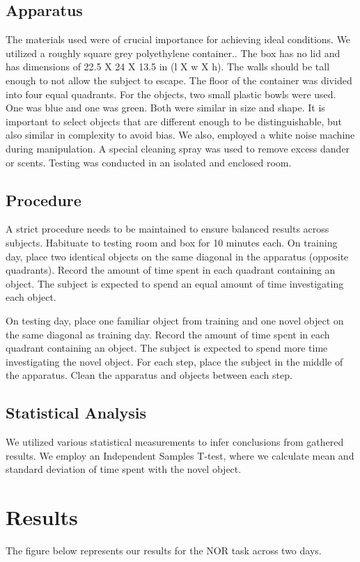\documentclass[a4paper, 12pt]{article}
\begin{document}
\subsection{Apparatus}
The materials used were of crucial importance for achieving ideal conditions. We utilized a roughly square grey polyethylene container.. The box has no lid and has dimensions of 22.5 X 24 X 13.5 in (l X w X h). The walls should be tall enough to not allow the subject to escape. The floor of the container was divided into four equal quadrants. For the objects, two small plastic bowls were used. One was blue and one was green. Both were similar in size and shape. It is important to select objects that are different enough to be distinguishable, but also similar in complexity to avoid bias. We also, employed a white noise machine during manipulation. A special cleaning spray was used to remove excess dander or scents. Testing was conducted in an isolated and enclosed room.

\subsection{Procedure}
A strict procedure needs to be  maintained to ensure balanced results across subjects. Habituate to testing room and box for 10 minutes each. On training day, place two identical objects on the same diagonal in the apparatus (opposite quadrants). Record the amount of time spent in each quadrant containing an object. The subject is expected to spend an equal amount of time investigating each object.

On testing day, place one familiar object from training and one novel object on the same diagonal as training day. Record the amount of time spent in each quadrant containing an object. The subject is expected to spend more time investigating the novel object.
For each step, place the subject in the middle of the apparatus. Clean the apparatus and objects between each step.

\subsection{Statistical Analysis}
We utilized various statistical measurements to infer conclusions from gathered results. We employ an Independent Samples T-test, where we calculate mean and standard deviation of time spent with the novel object.

\section{Results}
The figure below represents our results for the NOR task across two days.
\end{document}
